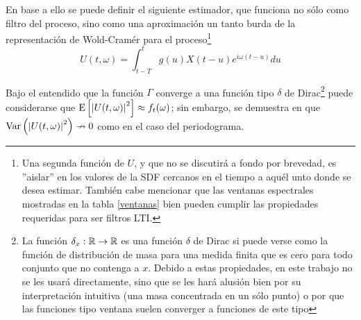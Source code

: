 En base a ello se puede definir el siguiente estimador, que funciona no s\'olo como filtro del
proceso, sino como una aproximaci\'on un tanto burda de la representaci\'on de Wold-Cram\'er
para el 
proceso\footnote{Una segunda funci\'on de $U$, y que no se discutir\'a a fondo por brevedad, 
es ''aislar'' en los
valores de la SDF cercanos en el tiempo a aqu\'el unto donde se desea estimar.
Tambi\'en cabe mencionar que las ventanas espectrales mostradas en la tabla \ref{ventanas}
bien pueden cumplir las propiedades requeridas para ser filtros LTI.}
\begin{equation*}
U(t,\omega) = \int_{t-T}^{t} g(u) X({t-u}) e^{i \omega (t-u)} du
\end{equation*}

%
%
%


Bajo el entendido que la funci\'on $\Gamma$ converge a una funci\'on tipo $\delta$ de 
Dirac\footnote{La funci\'on $\delta_x:\mathbb{R}\rightarrow \mathbb{R}$ 
es una funci\'on $\delta$ de Dirac si puede verse como la funci\'on de distribuci\'on de masa
para una medida finita que es cero para todo conjunto que no contenga a $x$.
Debido a estas propiedades, 
en este trabajo no se les usar\'a directamente, sino que se les har\'a alusi\'on bien por su 
interpretaci\'on intuitiva (una masa concentrada en un s\'olo punto) o por que las funciones tipo
ventana suelen converger a funciones de este tipo}
puede considerarse que $\mathrm{E}\left[ \left| U(t,\omega) \right|^{2} \right] \approx f_t(\omega)$; sin embargo, se
demuestra en \cite{Priestley66} que $\mathrm{Var}\left( \left| U(t,\omega) \right|^{2} \right) \nrightarrow 0$ como en el
caso del periodograma.

